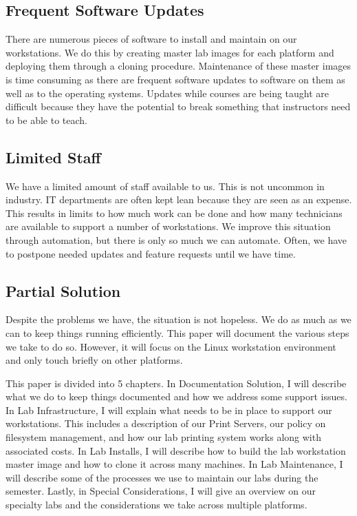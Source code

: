 \subsection{Frequent Software Updates}
There are numerous pieces of software to install and maintain on our workstations.  We do this by creating master lab images for each platform and deploying them through a cloning procedure.  Maintenance of these master images is time consuming as there are frequent software updates to software on them as well as to the operating systems.  Updates while courses are being taught are difficult because they have the potential to break something that instructors need to be able to teach. 

\subsection{Limited Staff}
We have a limited amount of staff available to us.  This is not uncommon in industry.  IT departments are often kept lean because they are seen as an expense.  This results in limits to how much work can be done and how many technicians are available to support a number of workstations.  We improve this situation through automation, but there is only so much we can automate.  Often, we have to postpone needed updates and feature requests until we have time.   

\subsection{Partial Solution}
Despite the problems we have, the situation is not hopeless.  We do as much as we can to keep things running efficiently.  This paper will document the various steps we take to do so.  However, it will focus on the Linux workstation environment and only touch briefly on other platforms.  

This paper is divided into 5 chapters.  In Documentation Solution, I will describe what we do to keep things documented and how we address some support issues.  In Lab Infrastructure, I will explain what needs to be in place to support our workstations.  This includes a description of our Print Servers, our policy on filesystem management, and how our lab printing system works along with associated costs.  In Lab Installs, I will describe how to build the lab workstation master image and how to clone it across many machines.  In Lab Maintenance, I will describe some of the processes we use to maintain our labs during the semester.  Lastly, in Special Considerations, I will give an overview on our specialty labs and the considerations we take across multiple platforms. 
